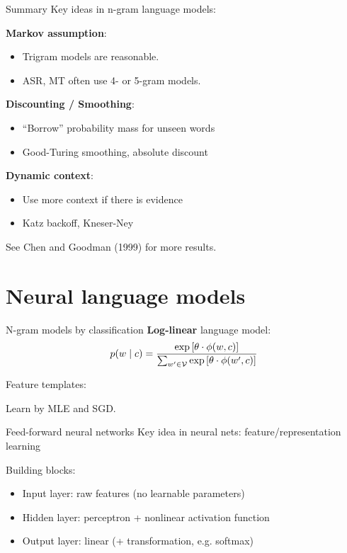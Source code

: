 \documentclass[usenames,dvipsnames,notes]{beamer}
\begin{document}
\begin{frame}
    {Summary}
    Key ideas in n-gram language models:

    \textbf{Markov assumption}:\\
    \begin{itemize}
        \item Trigram models are reasonable.
        \item ASR, MT often use 4- or 5-gram models.
    \end{itemize}

    \textbf{Discounting / Smoothing}:\\
    \begin{itemize}
        \item ``Borrow'' probability mass for unseen words
        \item Good-Turing smoothing, absolute discount
    \end{itemize}

    \textbf{Dynamic context}:\\
    \begin{itemize}
        \item Use more context if there is evidence
        \item Katz backoff, Kneser-Ney
    \end{itemize}

    See Chen and Goodman (1999) for more results.
\end{frame}

\section{Neural language models}
\begin{frame}
    {N-gram models by classification}
    \textbf{Log-linear} language model:
    $$
    p(w\mid c) = \frac{
        \exp\left[ \theta\cdot \phi(w, c) \right]
    }{
        \sum_{w'\in\mathcal{V}}\exp\left[ \theta\cdot \phi(w', c) \right]
    }
    $$

    Feature templates:\\
    \vspace{9em}

    Learn by MLE and SGD.
\end{frame}

\begin{frame}
    {Feed-forward neural networks}
    Key idea in neural nets: feature/representation learning 

    Building blocks:\\
    \begin{itemize}
        \itemsep2em
        \item Input layer: raw features (no learnable parameters)
        \item Hidden layer: perceptron + nonlinear activation function
        \item Output layer: linear (+ transformation, e.g. softmax)
    \end{itemize}
\end{frame}
\end{document}
